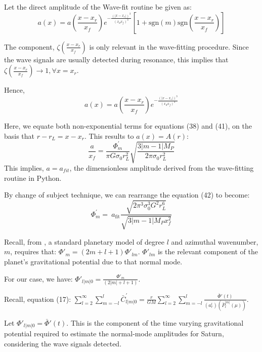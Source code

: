 \documentclass{article}
\begin{document}
\vspace{5}

Let the direct amplitude of the Wave-fit routine be given as:
\begin{equation}
    a(x) = a(\frac{x-x_{r}}{x_{f}})e^{-\frac{(|x-x_{r}|)^{3}}{(x_{d}x_{f})^{3}}}[1 + \mathrm{sgn}(m) \mathrm{sgn}(\frac{x-x_{r}}{x_{f}})]
\end{equation}

The component, $\zeta(\frac{x-x_{r}}{x_{f}})$ is only relevant in the wave-fitting procedure. Since the wave signals are usually detected during resonance, this implies that $\zeta(\frac{x-x_{r}}{x_{f}}) \rightarrow 1, \forall  x = x_{r}.$

Hence,
\begin{equation}
    a(x) = a(\frac{x-x_{r}}{x_{f}})e^{-\frac{(|x-x_{r}|)^{3}}{(x_{d}x_{f})^{3}}}
\end{equation}

Here, we equate both non-exponential terms for equations (38) and (41), on the basis that $ r-r_{L} = x-x_{r}$. This results to $a(x) = A(r)$:
\begin{equation}
    \frac{a}{x_{f}} = \frac{\Phi^{'}_{m}}{\pi G\sigma_{0}r_{L}^{2}}\sqrt{\frac{3|m-1|M_{P}}{2\pi\sigma_{0}r_{L}^{2}}}
\end{equation}
This implies, $a = a_{fit}$, the dimensionless amplitude derived from the wave-fitting routine in Python. 

By change of subject technique, we can rearrange the equation (42) to become:
\begin{equation}
   \Phi^{'}_{m} = \ a_{\text{fit}} \frac{\sqrt{2\pi^{3}\sigma_{0}^{3}G^{2}r_{L}^{6}}}{\sqrt{3|m-1|M_{P} x_{f}^{2}}}
\end{equation}

Recall, from \cite{Hedman_2022}\cite{Marley1993PlanetaryAM}, a standard planetary model of degree $l$ and azimuthal wavenumber, $m$, requires that: $\Phi'_{m} = (2m + l + 1) \Phi{'}_{lm}$. $\Phi{'}_{lm}$ is the relevant component of the planet’s gravitational potential due to that normal mode. 

For our case, we have: $\Phi{'}_{l|m|0} = \frac{\Phi'_{m}}{(2|m| + l + 1)}$. 

Recall, equation (17): $\sum_{l=2}^{\infty}\sum_{m=-l}^{l}\bar{C}_{l|m|0}^{'} =\frac{r}{GM} \sum_{l=2}^{\infty}\sum_{m=-l}^{l}\frac{\bar{\Phi}{'}(t)}{(a_{r}^{l})(\bar{P}_{l}^{|m|}(\mu))}$. 

Let $\Phi{'}_{l|m|0} = \bar{\Phi}{'}(t)$. This is the component of the time varying gravitational potential required to estimate the normal-mode amplitudes for Saturn, considering the wave signals detected. 
\end{document}

